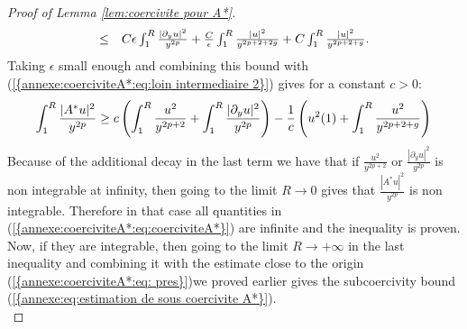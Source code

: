 \documentclass[11pt,a4paper,reqno]{amsart}
\theoremstyle{remark}
\numberwithin{equation}{section}
\begin{document}
\begin{appendix}
\begin{proof}[Proof of Lemma \ref{lem:coercivite pour A*}]
$$\begin{array}{r c l}
\leq& C\epsilon \int_1^{R} \frac{|\partial_y u|^2}{y^{2p}}+\frac{C}{\epsilon}  \int_1^{R} \frac{|u|^2}{y^{2p+2+2g}}+C \int_1^{R} \frac{|u|^2}{y^{2p+2+g}}.
\end{array}
$$
Taking $\epsilon$ small enough and combining this bound with {{\rm (\ref{{annexe:coerciviteA*:eq:loin intermediaire 2}})}} gives for a constant $c>0$:
$$
\int_1^R \frac{|A^*u|^2}{y^{2p}} \geq c\left(  \int_1^R \frac{u^2}{y^{2p+2}}+\int_1^R \frac{|\partial_y u|^2}{y^{2p}}\right)-\frac{1}{c}\left(u^2(1)+ \int_1^R \frac{u^2}{y^{2p+2+g}}\right) \\
$$
Because of the additional decay in the last term we have that if $\frac{u^2}{y^{2p+2}}$ or $\frac{|\partial_y u|^2}{y^{2p}}$ is non integrable at infinity, then going to the limit $R\rightarrow 0$ gives that $\frac{|A^*u|^2}{y^{2p}}$ is non integrable. Therefore in that case all quantities in {{\rm (\ref{{annexe:coerciviteA*:eq:coerciviteA*}})}} are infinite and the inequality is proven. Now, if they are integrable, then going to the limit $R\rightarrow +\infty$ in the last inequality and combining it with the estimate close to the origin {{\rm (\ref{{annexe:coerciviteA*:eq: pres}})}}we proved earlier gives the subcoercivity bound {{\rm (\ref{{annexe:eq:estimation de sous coercivite A*}})}}.\\


\end{proof}
\end{appendix}
\end{document}
